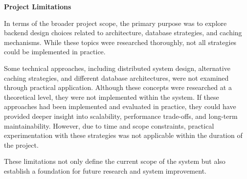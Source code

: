 \textbf{Project Limitations}

In terms of the broader project scope, the primary purpose was to explore backend design choices 
related to architecture, database strategies, and caching mechanisms. 
While these topics were researched thoroughly, not all strategies could be implemented in practice. 

Some technical approaches, including distributed system design, alternative caching strategies, 
and different database architectures, were not examined through practical application. 
Although these concepts were researched at a theoretical level, 
they were not implemented within the system. 
If these approaches had been implemented and evaluated in practice, 
they could have provided deeper insight into scalability, performance trade-offs, 
and long-term maintainability. 
However, due to time and scope constraints, practical experimentation with these strategies 
was not applicable within the duration of the project.

These limitations not only define the current scope of the system 
but also establish a foundation for future research and system improvement.

